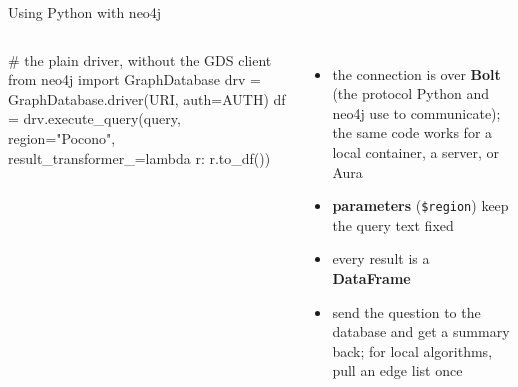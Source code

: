 \documentclass[aspectratio=169, 10pt]{beamer}
\begin{document}
\begin{frame}[fragile]{Using Python with neo4j}
  \vspace{0.1cm}
  \begin{columns}[T]
      \begin{codesmall}[Python]
# the plain driver, without the GDS client
from neo4j import GraphDatabase
drv = GraphDatabase.driver(URI, auth=AUTH)
df = drv.execute_query(query, region="Pocono",
        result_transformer_=lambda r: r.to_df())
      \end{codesmall}
      \small
      \begin{itemize}
        \item the connection is over \textbf{Bolt} (the protocol Python and neo4j use to communicate); the same code works for a local container, a server, or Aura
        \item \textbf{parameters} (\texttt{\$region}) keep the query text fixed
        \item every result is a \textbf{DataFrame}
        \item send the question to the database and get a summary back; for local algorithms, pull an edge list once
      \end{itemize}
  \end{columns}
\end{frame}
\end{document}
